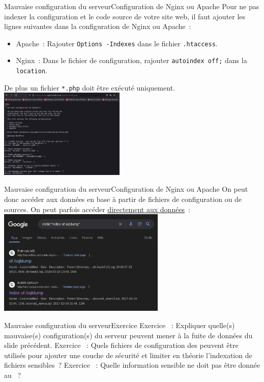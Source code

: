 \documentclass{beamer}
\begin{document}
    \begin{frame}{Mauvaise configuration du serveur}{Configuration de Nginx ou Apache}
        Pour ne pas indexer la configuration et le code source de votre site web, il faut ajouter les lignes suivantes dans la configuration de Nginx ou Apache~:
        \begin{itemize}
            \item Apache~: Rajouter \lstinline{Options -Indexes} dans le fichier \lstinline{.htaccess}.
            \item Nginx~: Dans le fichier de configuration, rajouter \lstinline{autoindex off;} dans la \lstinline{location}.
        \end{itemize}
        De plus un fichier \lstinline{*.php} doit être exécuté uniquement.
        \bigbreak
        \centering
        \includegraphics[width=6cm]{image/php-to-execute}
    \end{frame}

    \begin{frame}{Mauvaise configuration du serveur}{Configuration de Nginx ou Apache}
        On peut donc accéder aux données en base à partir de fichiers de configuration ou de sources.
        \bigbreak
        On peut parfois accéder \href{https://www.google.com/search?q=intitle\%3A\%22index+of+sqldump\%22}{directement aux données}~:
        \bigbreak
        \centering
        \includegraphics[width=8cm]{image/dork-sqldump}
    \end{frame}

    \begin{frame}{Mauvaise configuration du serveur}{Exercice}
        Exercice \execcounterdispinc{}~:
        Expliquer quelle(s) mauvaise(s) configuration(s) du serveur peuvent mener à la fuite de données du slide précédent.
        \bigbreak
        Exercice \execcounterdispinc{}~:
        Quels fichiers de configuration des  peuvent être utilisés pour ajouter une couche de sécurité et limiter en théorie l'indexation de fichiers sensibles~?
        Exercice \execcounterdispinc{}~:
        Quelle information sensible ne doit pas être donnée au ~?
    \end{frame}
\end{document}
